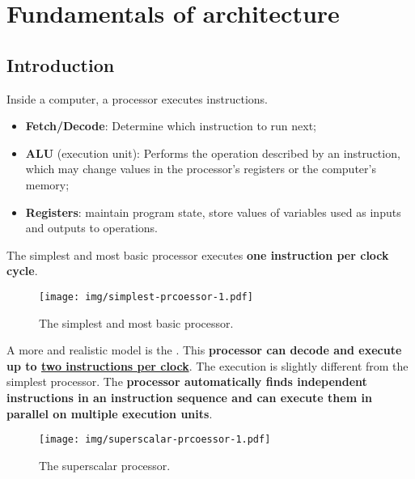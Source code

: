 \section{Fundamentals of architecture}

\subsection{Introduction}

Inside a computer, a processor executes instructions.
\begin{itemize}
    \item \textbf{Fetch/Decode}: Determine which instruction to run next;
    \item \textbf{ALU} (execution unit): Performs the operation described by an instruction, which may change values in the processor's registers or the computer's memory;
    \item \textbf{Registers}: maintain program state, store values of variables used as inputs and outputs to operations.
\end{itemize}
The simplest and most basic processor executes \textbf{one instruction per clock cycle}.
\begin{figure}[!htp]
    \centering
    \texttt{[image: img/simplest-prcoessor-1.pdf]}
    \caption{The simplest and most basic processor.}
\end{figure}

\noindent
A more  and realistic model is the . This \textbf{processor can decode and execute up to \underline{two instructions per clock}}. The execution is slightly different from the simplest processor. The \textbf{processor automatically finds independent instructions in an instruction sequence and can execute them in parallel on multiple execution units}.
\begin{figure}[!htp]
    \centering
    \texttt{[image: img/superscalar-prcoessor-1.pdf]}
    \caption{The superscalar processor.}
\end{figure}